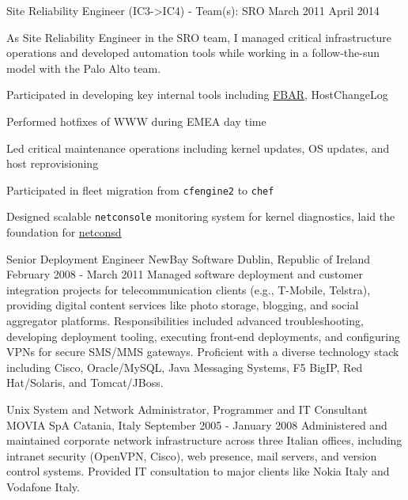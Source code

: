 \begin{cventries}
  \cventryprevrole
  {Site Reliability Engineer (IC3->IC4) - Team(s): SRO}
  {
    March 2011 \newline April 2014
  }
  {
    As Site Reliability Engineer in the SRO team, I managed critical infrastructure operations and developed automation tools while working in a follow-the-sun model with the Palo Alto team.
    \vspace{2mm}
    \begin{cvitems}
      \item {Participated in developing key internal tools including \href{https://engineering.fb.com/2011/09/15/data-center-engineering/making-facebook-self-healing/}{FBAR}, HostChangeLog}
      \item {Performed hotfixes of WWW during EMEA day time}
      \item {Led critical maintenance operations including kernel updates, OS updates, and host reprovisioning}
      \item {Participated in fleet migration from \texttt{cfengine2} to \texttt{chef}}
      \item {Designed scalable \texttt{netconsole} monitoring system for kernel diagnostics, laid the foundation for \href{https://lcccna2016.sched.com/event/7RTv/monitoring-the-linux-kernel-at-facebook-calvin-owens-facebook}{netconsd}}
    \end{cvitems}
  }

  \cventry
  {Senior Deployment Engineer} %
  {NewBay Software} %
  {Dublin, Republic of Ireland} %
  {February 2008 - March 2011} %
  {
    Managed software deployment and customer integration projects for telecommunication clients (e.g., T-Mobile, Telstra), providing digital content services like photo storage, blogging, and social aggregator platforms. Responsibilities included advanced troubleshooting, developing deployment tooling, executing front-end deployments, and configuring VPNs for secure SMS/MMS gateways. Proficient with a diverse technology stack including Cisco, Oracle/MySQL, Java Messaging Systems, F5 BigIP, Red Hat/Solaris, and Tomcat/JBoss.
  }

  \cventry
  {Unix System and Network Administrator, Programmer and IT Consultant} %
  {MOVIA SpA} %
  {Catania, Italy} %
  {September 2005 - January 2008} %
  {
    Administered and maintained corporate network infrastructure across three Italian offices, including intranet security (OpenVPN, Cisco), web presence, mail servers, and version control systems. Provided IT consultation to major clients like Nokia Italy and Vodafone Italy.
  }


\end{cventries}
